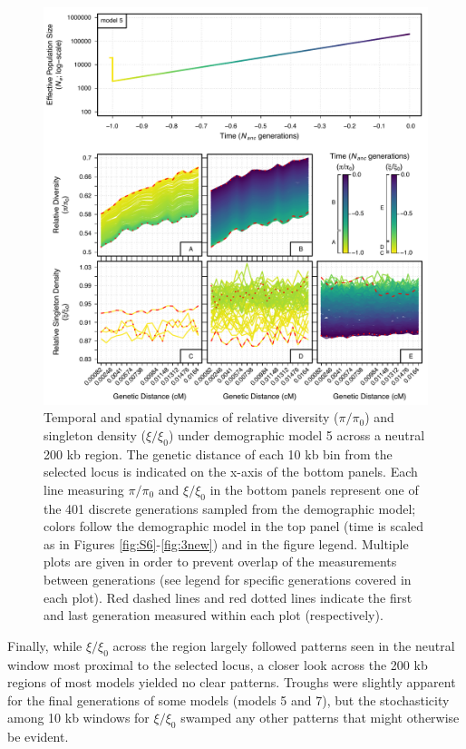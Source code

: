 \documentclass[9pt,twocolumn,twoside]{rilabRxiv}
\begin{document}
\begin{figure}[t!]
\includegraphics[width=\linewidth]{figures/FigS13.pdf}
\caption{Temporal and spatial dynamics of relative diversity ($\pi/\pi_0$) and singleton density ($\xi/\xi_0$) under demographic model 5 across a neutral 200 kb region. The genetic distance of each 10 kb bin from the selected locus is indicated on the x-axis of the bottom panels. Each line measuring $\pi/\pi_0$ and $\xi/\xi_0$ in the bottom panels represent one of the 401 discrete generations sampled from the demographic model; colors follow the demographic model in the top panel (time is scaled as in Figures \ref{fig:S6}-\ref{fig:3new}) and in the figure legend. Multiple plots are given in order to prevent overlap of the measurements between generations (see legend for specific generations covered in each plot). Red dashed lines and red dotted lines indicate the first and last generation measured within each plot (respectively).}
\label{fig:200kb}
\end{figure}

Finally, while $\xi/\xi_0$ across the region largely followed patterns seen in the neutral window most proximal to the selected locus, a closer look across the 200 kb regions of most models yielded no clear patterns. 
Troughs were slightly apparent for the final generations of some models (models 5 and 7), but the stochasticity among 10 kb windows for $\xi/\xi_0$ swamped any other patterns that might otherwise be evident.
\end{document}
